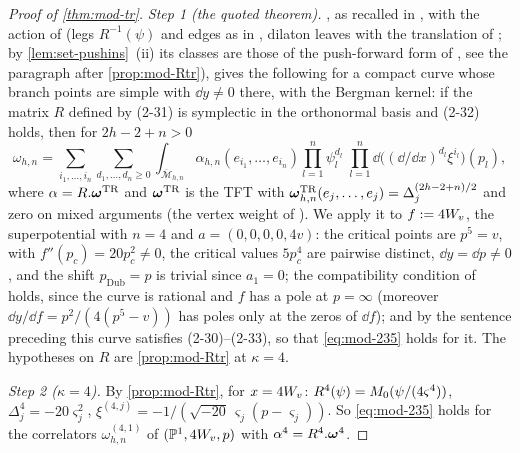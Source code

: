 \begin{proof}[Proof of \cref{thm:mod-tr}]
\emph{Step 1 (the quoted theorem).} \cite[Thm.~4.1]{DuninBarkowski:2012bw}, as recalled in \cite[\S2.6, (2-30)--(2-35)]{Dunin-Barkowski:2015caa}, with the action of \cite[\S2.3]{Dunin-Barkowski:2015caa} (legs $R^{-1}(\psi)$ and edges as in \cite[Def.~2.2]{PPZ15}, dilaton leaves with the translation of \cite[Def.~2.13]{PPZ15}; by \cref{lem:set-pushins}~(ii) its classes are those of the push-forward form of \cite[Def.~2.5]{PPZ15}, see the paragraph after \cref{prop:mod-Rtr}), gives the following for a compact curve whose branch points are simple with $\dd y\neq 0$ there, with the Bergman kernel: if the matrix $R$ defined by (2-31) is symplectic in the orthonormal basis and (2-32) holds, then for $2h-2+n>0$
\begin{equation}
\label{eq:mod-235}
\omega_{h,n}=\sum_{i_1,\dots,i_n}\sum_{d_1,\dots,d_n\geq 0}\int_{\overline{\mathcal M}_{h,n}}\alpha_{h,n}(e_{i_1},\dots,e_{i_n})\prod_{l=1}^n\psi_l^{d_l}\;\prod_{l=1}^n\dd\big((\dd/\dd x)^{d_l}\xi^{i_l}\big)(p_l),
\end{equation}
where $\alpha=R.\boldsymbol{\omega}^{\mathrm{TR}}$ and $\boldsymbol{\omega}^{\mathrm{TR}}$ is the TFT with $\boldsymbol{\omega}^{\mathrm{TR}}_{h,n}(e_j,\dots,e_j)=\Delta_j^{(2h-2+n)/2}$ and zero on mixed arguments (the vertex weight of \cite[\S2.3]{DuninBarkowski:2012bw}). We apply it to $f:=4W_{v}$, the superpotential \cite[(8-1)]{Dunin-Barkowski:2015caa} with $n=4$ and $a=(0,0,0,0,4v)$: the critical points are $p^5=v$, with $f''(p_c)=20p_c^2\neq 0$, the critical values $5p_c^4$ are pairwise distinct, $\dd y=\dd p\neq 0$, and the shift $p_{\mathrm{Dub}}=p$ is trivial since $a_1=0$; the compatibility condition of \cite[Prop.~4.3 (1)]{Dunin-Barkowski:2015caa} holds, since the curve is rational and $f$ has a pole at $p=\infty$ (moreover $\dd y/\dd f=p^2/(4(p^5-v))$ has poles only at the zeros of $\dd f$); and by the sentence preceding \cite[Thm.~8.1]{Dunin-Barkowski:2015caa} this curve satisfies (2-30)--(2-33), so that \eqref{eq:mod-235} holds for it. The hypotheses on $R$ are \cref{prop:mod-Rtr} at $\kappa=4$.

\emph{Step 2 ($\kappa=4$).} By \cref{prop:mod-Rtr}, for $x=4W_{v}$: $R^{4}(\psi)=M_{0}(\psi/(4\varsigma^4))$, $\Delta^{4}_j=-20\varsigma_j^2$, $\xi^{(4,j)}=-1/(\sqrt{-20}\,\varsigma_j(p-\varsigma_j))$. So \eqref{eq:mod-235} holds for the correlators $\omega^{(4,1)}_{h,n}$ of $(\mathbb{P}^1,4W_{v},p)$ with $\alpha^{4}=R^{4}.\boldsymbol{\omega}^{4}$.


\end{proof}
